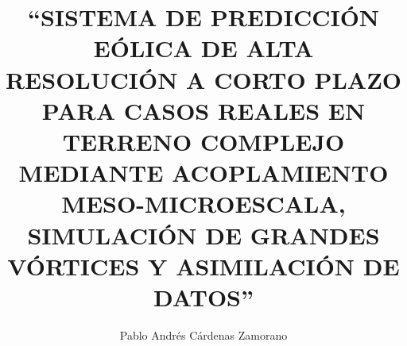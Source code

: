 \documentclass[oneside,authoryear,spanish,a4paper]{ezthesis}
\author{Pablo Andrés Cárdenas Zamorano}
\title{``SISTEMA DE PREDICCIÓN EÓLICA DE ALTA RESOLUCIÓN A CORTO PLAZO PARA CASOS REALES EN TERRENO COMPLEJO MEDIANTE ACOPLAMIENTO MESO-MICROESCALA, SIMULACIÓN DE GRANDES VÓRTICES Y ASIMILACIÓN DE DATOS''}
\numberwithin{equation}{section}
\begin{document}
\sloppy 


















\tableofcontents
\listoffigures
\listoftables

%
%

%

%

%

%

%

%

\appendix


%
%

%

\nocite{*}     %

\end{document}
